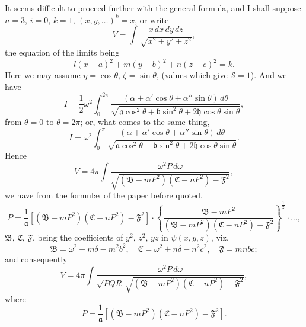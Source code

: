 \documentclass[11pt,a4paper]{article}
\theoremstyle{definition}
\begin{document}
It seems difficult to proceed further with the general formula, and I shall suppose $n = 3$, $i = 0$, $k = 1$, $(x, y, \ldots)^{k} = x$, or write
\[
V = \int \frac{x\, dx\, dy\, dz}{\sqrt{x^{2} + y^{2} + z^{2}}},
\]
the equation of the limits being
\[
l(x-a)^{2} + m(y-b)^{2} + n(z-c)^{2} = k.
\]
Here we may assume $\eta = \cos\theta$, $\zeta = \sin\theta$, (values which give $\mathcal{S} = 1$). And we have
\[
I = \frac{1}{2}\omega^{2} \int_{0}^{2\pi} \frac{(\alpha + \alpha'\cos\theta + \alpha''\sin\theta)\, d\theta}{\sqrt{\mathfrak{a}\cos^{2}\theta + \mathfrak{b}\sin^{2}\theta + 2\mathfrak{h}\cos\theta\sin\theta}},
\]
from $\theta = 0$ to $\theta = 2\pi$; or, what comes to the same thing,
\[
I = \omega^{2} \int_{0}^{\pi} \frac{(\alpha + \alpha'\cos\theta + \alpha''\sin\theta)\, d\theta}{\sqrt{\mathfrak{a}\cos^{2}\theta + \mathfrak{b}\sin^{2}\theta + 2\mathfrak{h}\cos\theta\sin\theta}}.
\]
Hence
\[
V = 4\pi \int \frac{\omega^{2}P\, d\omega}{\sqrt{(\mathfrak{B} - mP^{2})(\mathfrak{C} - nP^{2}) - \mathfrak{F}^{2}}},
\]
we have from the formul\ae\ of the paper before quoted,
\[
P = \frac{1}{\mathfrak{a}}\left[(\mathfrak{B} - mP^{2})(\mathfrak{C} - nP^{2}) - \mathfrak{F}^{2}\right] \cdot \left\{\frac{\mathfrak{B} - mP^{2}}{(\mathfrak{B} - mP^{2})(\mathfrak{C} - nP^{2}) - \mathfrak{F}^{2}}\right\}^{\frac{1}{2}} \cdot \ldots,
\]
$\mathfrak{B}$, $\mathfrak{C}$, $\mathfrak{F}$, being the coefficients of $y^{2}$, $z^{2}$, $yz$ in $\psi(x, y, z)$, viz.
\[
\mathfrak{B} = \omega^{2} + m\delta - m^{2}b^{2}, \quad \mathfrak{C} = \omega^{2} + n\delta - n^{2}c^{2}, \quad \mathfrak{F} = mnbc;
\]
and consequently
\[
V = 4\pi \int \frac{\omega^{2}P\, d\omega}{\sqrt{PQR}\, \sqrt{(\mathfrak{B} - mP^{2})(\mathfrak{C} - nP^{2}) - \mathfrak{F}^{2}}},
\]
where
\[
P = \frac{1}{\mathfrak{a}}\left[(\mathfrak{B} - mP^{2})(\mathfrak{C} - nP^{2}) - \mathfrak{F}^{2}\right].
\]

\newpage

\setcounter{page}{444}
\end{document}
